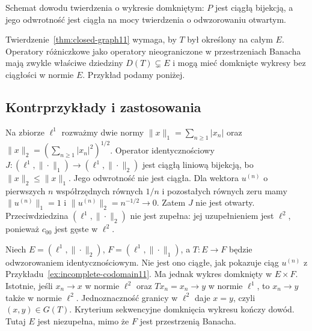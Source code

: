 \begin{center}

\smallskip
\small Schemat dowodu twierdzenia o wykresie domkniętym:
$P$ jest ciągłą bijekcją, a jego odwrotność jest ciągła
na mocy twierdzenia o odwzorowaniu otwartym.
\end{center}

\begin{uwaga}
Twierdzenie~\ref{thm:closed-graph11} wymaga, by $T$ był
określony na całym $E$. Operatory różniczkowe jako
operatory nieograniczone w przestrzeniach Banacha mają
zwykle właściwe dziedziny $D(T)\subsetneq E$ i mogą
mieć domknięte wykresy bez ciągłości w normie $E$.
Przykład podamy poniżej.
\end{uwaga}

\subsection{Kontrprzykłady i zastosowania}

\begin{przyklad}
\label{ex:incomplete-codomain11}
Na zbiorze $\ell^1$ rozważmy dwie normy
$\|x\|_1=\sum_{n\ge1}|x_n|$ oraz
$\|x\|_2=(\sum_{n\ge1}|x_n|^2)^{1/2}$.
Operator identycznościowy
$J:(\ell^1,\|\cdot\|_1)\to(\ell^1,\|\cdot\|_2)$
jest ciągłą liniową bijekcją, bo $\|x\|_2\le\|x\|_1$.
Jego odwrotność nie jest ciągła. Dla wektora $u^{(n)}$
o pierwszych $n$ współrzędnych równych $1/n$
i pozostałych równych zeru mamy
$\|u^{(n)}\|_1=1$ i $\|u^{(n)}\|_2=n^{-1/2}\to0$.
Zatem $J$ nie jest otwarty. Przeciwdziedzina
$(\ell^1,\|\cdot\|_2)$ nie jest zupełna: jej
uzupełnieniem jest $\ell^2$, ponieważ $c_{00}$ jest
gęste w $\ell^2$.
\end{przyklad}

\begin{przyklad}
\label{ex:incomplete-domain-graph11}
Niech $E=(\ell^1,\|\cdot\|_2)$, $F=(\ell^1,\|\cdot\|_1)$,
a $T:E\to F$ będzie odwzorowaniem identycznościowym.
Nie jest ono ciągłe, jak pokazuje ciąg $u^{(n)}$ z
Przykładu~\ref{ex:incomplete-codomain11}. Ma jednak
wykres domknięty w $E\times F$. Istotnie, jeśli
$x_n\to x$ w normie $\ell^2$ oraz
$Tx_n=x_n\to y$ w normie $\ell^1$, to $x_n\to y$
także w normie $\ell^2$. Jednoznaczność granicy
w $\ell^2$ daje $x=y$, czyli $(x,y)\in G(T)$.
Kryterium sekwencyjne domknięcia wykresu kończy dowód.
Tutaj $E$ jest niezupełna, mimo że $F$ jest przestrzenią Banacha.
\end{przyklad}

